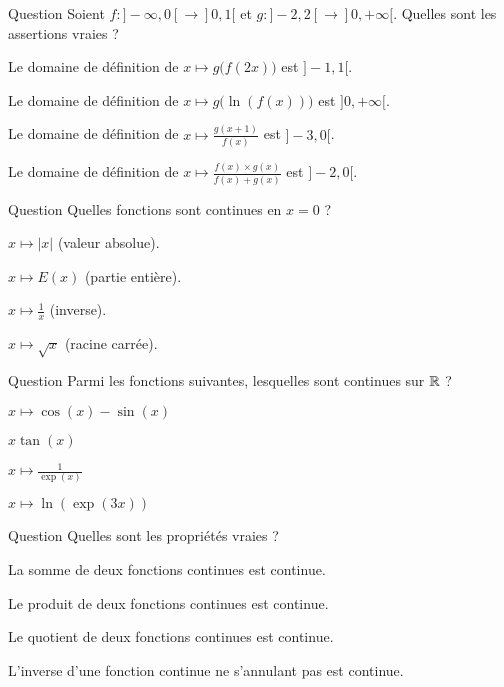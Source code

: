 \begin{multi}{Question}
Soient \(f : ]-\infty,0[ \to ]0,1[\) et \(g : ]-2,2[ \to ]0,+\infty[\).
Quelles sont les assertions vraies ?

    \item Le domaine de définition de \(x \mapsto g\big(f(2x)\big)\) est \(]-1,1[\).
    \item Le domaine de définition de \(x \mapsto g\big( \ln (f(x)) \big)\) est \(]0,+\infty[\).
    \item* Le domaine de définition de \(x \mapsto \frac{g(x+1)}{f(x)}\) est \(]-3,0[\).
    \item* Le domaine de définition de \(x \mapsto \frac{f(x) \times g(x)}{f(x)+g(x)}\) est \(]-2,0[\).
\end{multi}


\begin{multi}[multiple,feedback=
{La fonction inverse n'est pas définie à l'origine !
La fonction partie entière n'est pas continue à l'origine.
}]{Question}
Quelles fonctions sont continues en \(x=0\) ?

    \item* \(x \mapsto |x|\) (valeur absolue).
    \item \(x \mapsto E(x)\) (partie entière).
    \item \(x \mapsto \frac 1x\) (inverse).
    \item* \(x \mapsto \sqrt{x}\) (racine carrée).
\end{multi}


\begin{multi}[multiple,feedback=
{La fonction tangente n'est pas définie partout, et elle continue seulement sur son domaine de définition. 
Comme \(\ln(\exp(3x)) = 3x\) alors cette fonction sera continue sur \(\Rr\).
}]{Question}
Parmi les fonctions suivantes, lesquelles sont continues sur \(\Rr\) ?

    \item* \(x \mapsto \cos(x)-\sin(x)\)
    \item \(x \tan(x)\)
    \item* \(x \mapsto \frac{1}{\exp(x)}\)
    \item* \(x \mapsto \ln(\exp(3x))\)
\end{multi}


\begin{multi}[multiple,feedback=
{Le quotient de deux fonctions continues est une fonction continue, uniquement aux points où le dénominateur ne s'annule pas.
}]{Question}
Quelles sont les propriétés vraies ?

    \item* La somme de deux fonctions continues est continue.
    \item* Le produit de deux fonctions continues est continue.
    \item Le quotient de deux fonctions continues est continue.
    \item* L'inverse d'une fonction continue ne s'annulant pas est continue.
\end{multi}


